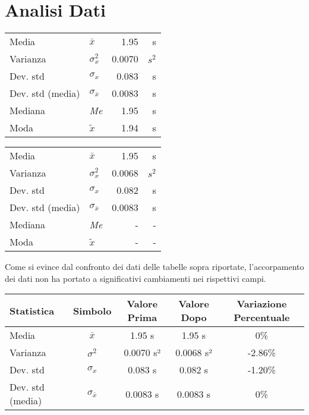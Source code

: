 \documentclass{article}
\begin{document}
\section{Analisi Dati}

\hspace{0.6cm}
    \begin{minipage}[c]{0.45\textwidth}
    	\centering 
        \begin{tabular}{llrr}
        	\toprule
            Media & $\bar{x}$ & 1.95 & s \\
            Varianza & $\sigma^2_x$ & 0.0070 & $s^2$ \\
            Dev. std & $\sigma_x$ & 0.083 & s \\
            Dev. std (media) & $\sigma_{\bar{x}}$ & 0.0083 & s \\
            Mediana & \textit{Me} & 1.95 & s \\
            Moda & $\tilde{x}$ & 1.94 & s \\
            \bottomrule 
        \end{tabular}
    \end{minipage}%
    \begin{minipage}[c]{0.45\textwidth}
    	\centering
        \begin{tabular}{llrr}
        	\toprule
            Media & $\bar{x}$ & 1.95 & s \\
            Varianza & $\sigma^2_x$ & 0.0068 & $s^2$ \\
            Dev. std & $\sigma_x$ & 0.082 & s \\
            Dev. std (media) & $\sigma_{\bar{x}}$ & 0.0083 & s \\
            Mediana & \textit{Me} & - & - \\
            Moda & $\tilde{x}$ & - & - \\
            \bottomrule
        \end{tabular}
    \end{minipage}
    \vspace{0.4cm}

\noindent
Come si evince dal confronto dei dati delle tabelle sopra riportate, l'accorpamento dei dati non ha portato a significativi cambiamenti nei rispettivi campi.
\begin{table}[ht]
\centering
{}
\begin{tabular}{lcccc}
\toprule
\textbf{Statistica} & \textbf{Simbolo} & \textbf{Valore Prima} & \textbf{Valore Dopo} & \textbf{Variazione Percentuale} \\
\midrule
Media & $\bar{x}$ & 1.95 s & 1.95 s & 0\% \\
Varianza & $\sigma^2$ & 0.0070 s² & 0.0068 s² & -2.86\% \\
Dev. std & $\sigma_x$ & 0.083 s & 0.082 s & -1.20\% \\
Dev. std (media) & $\sigma_{\bar{x}}$ & 0.0083 s & 0.0083 s & 0\% \\
\bottomrule
\end{tabular}
\label{tab:dati_accorpati}
\end{table}
\end{document}
